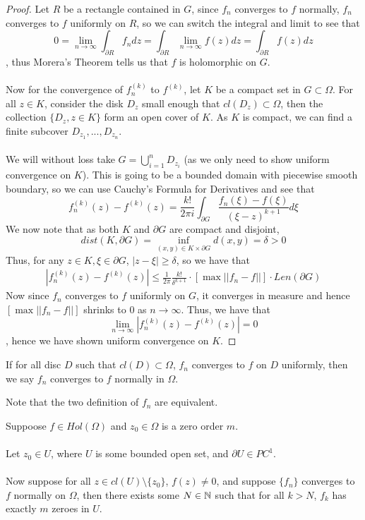 \begin{proof}
Let $R$ be a rectangle contained in $G$, since $f_n$ converges to $f$ normally, $f_n$ converges to $f$ uniformly on $R$, so we can switch the integral and limit to see that
\[0 = \lim_{n \to \infty} \int_{\partial R} f_n dz = \int_{\partial R} \lim_{n \to \infty} f(z) dz = \int_{\partial R} f(z) dz\]
, thus Morera's Theorem tells us that $f$ is holomorphic on $G$.\\\\
Now for the convergence of $f_n^{(k)}$ to $f^{(k)}$, let $K$ be a compact set in $G \subset \Omega$. For all $z \in K$, consider the disk $D_z$ small enough that $cl(D_z) \subset \Omega$, then the collection $\{D_z, z\in K\}$ form an open cover of $K$. As $K$ is compact, we can find a finite subcover $D_{z_1}, ..., D_{z_n}$.\\\\
We will without loss take $G = \bigcup_{i = 1}^n D_{z_i}$ (as we only need to show uniform convergence on $K$). This is going to be a bounded domain with piecewise smooth boundary, so we can use Cauchy's Formula for Derivatives and see that
\[f^{(k)}_n(z) - f^{(k)}(z) = \frac{k!}{2\pi i} \int_{\partial G} \frac{f_n(\xi) - f(\xi)}{(\xi - z)^{k+1}} d\xi\]
We now note that as both $K$ and $\partial G$ are compact and disjoint,
\[dist(K, \partial G) = \inf_{(x, y) \in K \times \partial G} d(x, y) = \delta > 0\]
Thus, for any $z \in K, \xi \in \partial G$, $|z - \xi| \geq \delta$, so we have that
\begin{align*}
    |f^{(k)}_n(z) - f^{(k)}(z)| \leq \frac{1}{2\pi} \frac{k!}{\delta^{k+1}} \cdot [\max ||f_n  - f||] \cdot Len(\partial G)
\end{align*}
Now since $f_n$ converges to $f$ uniformly on $G$, it converges in measure and hence $[\max ||f_n  - f||]$ shrinks to $0$ as $n \to \infty$. Thus, we have that
\[\lim_{n \to \infty} |f^{(k)}_n(z) - f^{(k)}(z)| = 0\]
, hence we have shown uniform convergence on $K$.
\end{proof}

\begin{definition}
If for all disc $D$ such that $cl(D) \subset \Omega$, $f_n$ converges to $f$ on $D$ uniformly, then we say $f_n$ converges to $f$ normally in $\Omega$.    
\end{definition}

Note that the two definition of $f_n$ are equivalent.

\begin{theorem}
    Suppoose $f \in Hol(\Omega)$ and $z_0 \in \Omega$ is a zero order $m$.\\\\
    Let $z_0 \in U$, where $U$ is some bounded open set, and $\partial U \in PC^1$.\\\\
    Now suppose for all $z \in cl(U) \setminus \{z_0\}$, $f(z) \neq 0$, and suppose $\{f_n\}$ converges to $f$ normally on $\Omega$, then there exists some $N \in \mathbb{N}$ such that for all $k > N$, $f_k$ has exactly $m$ zeroes in $U$.
\end{theorem}

